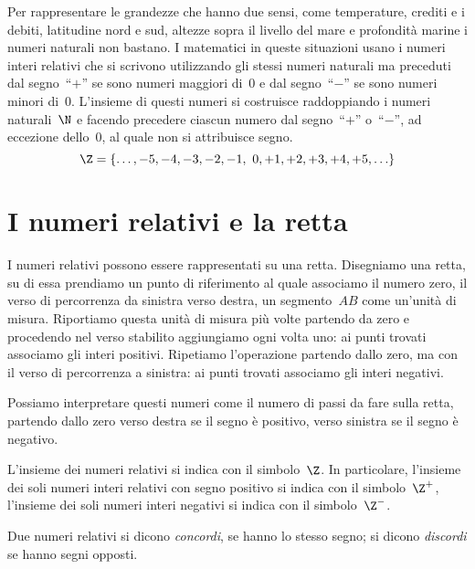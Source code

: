 Per rappresentare le grandezze che hanno due sensi, come temperature, crediti e 
i debiti, latitudine nord e sud,
altezze sopra il livello del mare e profondità marine i numeri naturali non 
bastano. I matematici in queste
situazioni usano i numeri interi relativi che si scrivono utilizzando gli stessi 
numeri naturali ma preceduti
dal segno~``\(+\)'' se sono numeri maggiori di~0 e dal segno~``\(-\)'' se sono 
numeri minori di~0. L'insieme di questi numeri
si costruisce raddoppiando i numeri naturali~\(\N\) e facendo precedere 
ciascun 
numero dal segno~``\(+\)'' o~``\(-\)'',
ad eccezione dello~0, al quale non si attribuisce segno.
\[ \Z=\lbrace\ldots,-5, -4, -3, -2, -1,~0, +1, +2, +3, +4, +5, 
\ldots\rbrace 
\]

\section{I numeri relativi e la retta}
\label{sec:02_retta}

I numeri relativi possono essere rappresentati su una retta. Disegniamo una 
retta, su di essa prendiamo
un punto di riferimento al quale associamo il numero zero, il verso di 
percorrenza da sinistra verso destra,
un segmento~\(AB\) come un'unità di misura. Riportiamo questa unità di 
misura più 
volte partendo da zero e
procedendo nel verso stabilito aggiungiamo ogni volta uno: ai punti trovati 
associamo gli interi positivi.
Ripetiamo l'operazione partendo dallo zero, ma con il verso di percorrenza 
a 
sinistra: ai punti trovati associamo
gli interi negativi.

\begin{center}
 
\end{center}

Possiamo interpretare questi numeri come il numero di passi da fare sulla 
retta, 
partendo dallo zero verso
destra se il segno è positivo, verso sinistra se il segno è negativo.

L'insieme dei numeri relativi si indica con il simbolo~\(\Z\). In 
particolare, 
l'insieme dei soli numeri interi relativi
con segno positivo si indica con il simbolo~\(\Z^+\),
l'insieme dei soli numeri interi negativi si indica con il 
simbolo~\(\Z^-\).

\begin{definizione}
 Due numeri relativi si dicono \emph{concordi}, se hanno lo stesso segno; 
si 
dicono \emph{discordi} se hanno
 segni opposti.
\end{definizione}

